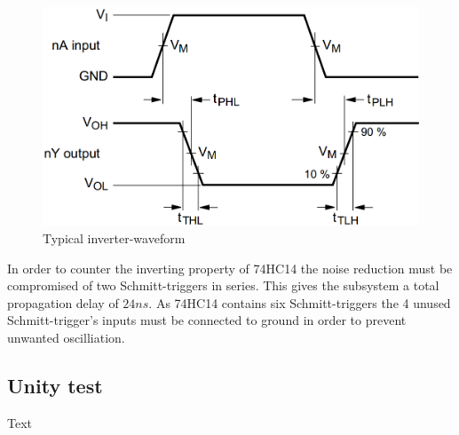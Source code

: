 \begin{figure}[H]
	\centering
	\includegraphics[width=0.5\linewidth]{Hardware/Pictures/74HC14_waveform}
	\caption{Typical inverter-waveform}
	\label{fig:SchmittTrigger_waveform}
\end{figure}

In order to counter the inverting property of 74HC14 the noise reduction must be compromised of two Schmitt-triggers in series. This gives the subsystem a total propagation delay of $24 ns$. As 74HC14 contains six Schmitt-triggers the 4 unused Schmitt-trigger's inputs must be connected to ground in order to prevent unwanted oscilliation.

\subsection{Unity test}
Text